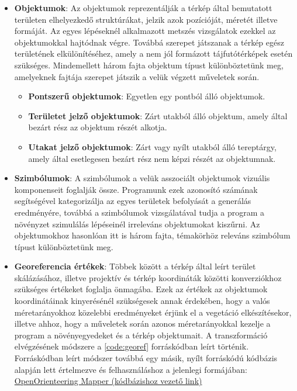 \begin{itemize}
  \itemsep1em
  \item \textbf{Objektumok}: Az objektumok reprezentálják a térkép által bemutatott területen elhelyezkedő struktúrákat, jelzik azok pozícióját, méretét illetve formáját. Az egyes lépéseknél alkalmazott metszés vizsgálatok ezekkel az objektumokkal hajtódnak végre. Továbbá szerepet játszanak a térkép egész területének elkülönítéséhez, amely a nem jól formázott tájfutótérképek esetén szükséges. Mindemellett három fajta objektum típust különböztetünk meg, amelyeknek fajtája szerepet játszik a velük végzett műveletek során.
  \begin{itemize}
    \item \textbf{Pontszerű objektumok}: Egyetlen egy pontból álló objektumok.
    \item \textbf{Területet jelző objektumok}: Zárt utakból álló objektum, amely által bezárt rész az objektum részét alkotja.
    \item \textbf{Utakat jelző objektumok}: Zárt vagy nyílt utakból álló tereptárgy, amely által esetlegesen bezárt rész nem képzi részét az objektumnak. 
  \end{itemize}
  \item \textbf{Szimbólumok}: A szimbólumok a velük asszociált objektumok vizuális komponenseit foglalják össze. Programunk ezek azonosító számának segítségével kategorizálja az egyes területek befolyását a generálás eredményére, továbbá a szimbólumok vizsgálatával tudja a program a növényzet szimulálás lépéseinél irreleváns objektumokat kiszűrni. Az objektumokhoz hasonlóan itt is három fajta, témakörhöz releváns szimbólum típust különböztetünk meg.
  \item \textbf{Georeferencia értékek}: Többek között a térkép által leírt terület skálázásához, illetve projektív és térkép koordináták közötti konverziókhoz szükséges értékeket foglalja önmagába. Ezek az értékek az objektumok koordinátáinak kinyerésénél szükségesek annak érdekében, hogy a valós méretarányokhoz közelebbi eredményeket érjünk el a vegetáció elkészítésekor, illetve ahhoz, hogy a műveletek során azonos méretarányokkal kezelje a program a növényegyedeket és a térkép objektumait. A transzformáció elvégzésének módszere a \ref{code:georef} forráskódban leírt történik. Forráskódban leírt módszer továbbá egy másik, nyílt forráskódú kódbázis alapján lett értelmezve és felhasználáshoz a jelenlegi formájában: \href{https://github.com/OpenOrienteering/mapper/blob/162b78212196c3fed97946608e463bf2ffaaf761/src/core/georeferencing.cpp}{OpenOrienteering Mapper (kódbázishoz vezető link)}

\end{itemize}

